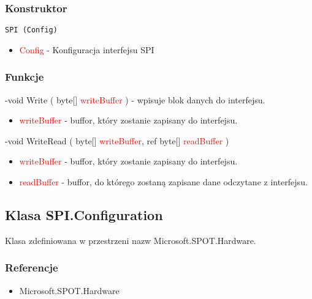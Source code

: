 \documentclass{article}
\begin{document}
\subsubsection{Konstruktor}
\begin{lstlisting}[frame=single]
SPI (Config)
\end{lstlisting}
\begin{itemize}
\item \textcolor{red}{Config} - Konfiguracja interfejsu SPI
\end{itemize}
\subsubsection{Funkcje}
-void Write ( byte[] \textcolor{red}{writeBuffer} ) - wpisuje blok danych do interfejsu.
\begin{itemize}
\item \textcolor{red}{writeBuffer} - buffor, który zostanie zapisany do interfejsu.
\end{itemize}
-void WriteRead ( byte[] \textcolor{red}{writeBuffer}, ref byte[] \textcolor{red}{readBuffer} )
\begin{itemize}
\item \textcolor{red}{writeBuffer} - buffor, który zostanie zapisany do interfejsu.
\item \textcolor{red}{readBuffer} - buffor, do którego zostaną zapisane dane odczytane z \newline interfejsu.
\end{itemize}

\subsection{Klasa SPI.Configuration}
Klasa zdefiniowana w przestrzeni nazw Microsoft.SPOT.Hardware. 
\subsubsection{Referencje}
\begin{itemize}
\item Microsoft.SPOT.Hardware
\end{itemize}
\end{document}
